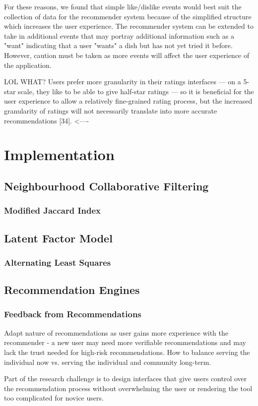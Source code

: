 For these reasons, we found that simple like/dislike events would best suit the collection of data for the recommender system because of the simplified structure which increases the user experience. The recommender system can be extended to take in additional events that may portray additional information such as a "want" indicating that a user "wants" a dish but has not yet tried it before. However, caution must be taken as more events will affect the user experience of the application. 





\cite{schafer2007collaborative}
LOL WHAT? Users prefer more granularity in their ratings interfaces — on a
5-star scale, they like to be able to give half-star ratings — so it is
beneficial for the user experience to allow a relatively fine-grained rating
process, but the increased granularity of ratings will not necessarily
translate into more accurate recommendations [34]. <----



\section{Implementation}

\subsection{Neighbourhood Collaborative Filtering}
\subsubsection{Modified Jaccard Index}


\subsection{Latent Factor Model}
\subsubsection{Alternating Least Squares}

\subsection{Recommendation Engines}


\subsubsection{Feedback from Recommendations}

\cite{martin2009recsys}
Adapt nature of recommendations as user gains more experience with the recommender - a new user may need more verifiable recommendations and may lack the trust needed for high-risk recommendations. 
How to balance serving the individual now vs. serving the individual and community long-term. 

Part of the research challenge is to design interfaces that give users control over the recommendation process without overwhelming the user or rendering the tool too complicated for novice users. 




